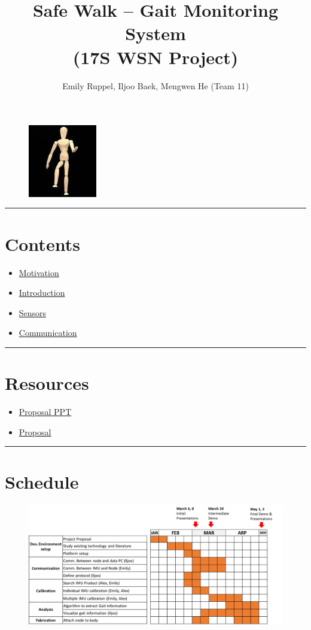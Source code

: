 \documentclass[letterpaper,12pt]{article}
\title{\textbf{Safe Walk -- Gait Monitoring System\\\small (17S WSN Project)}}
\author{Emily Ruppel, Iljoo Baek, Mengwen He (Team 11)}
\newcommand{\panhline}{\begin{center}\rule{\textwidth}{1pt}\end{center}}
\begin{document}
\maketitle

\begin{figure}[!h]
	\centering
	\includegraphics[width=3cm]{./imgs/marven.jpg}
\end{figure}

\panhline
\section{Contents}
\begin{itemize}
	\item \href{./Motivation/document.html}{Motivation}
	\item \href{./Introduction/document.html}{Introduction}
	\item \href{./Sensors/document.html}{Sensors}
	\item \href{./Communication/document.html}{Communication}
\end{itemize}

\panhline
\section{Resources}
\begin{itemize}
	\item \href{./PDFs/GaitMonitoring_Feb-24-17_v0.1.pdf}{Proposal PPT}
	\item \href{./PDFs/proposal_grp11.pdf}{Proposal}
\end{itemize}

\panhline
\section{Schedule}

\begin{figure}[!h]
	\centering
	\includegraphics[width=15cm]{./imgs/schedule.png}
\end{figure}
\end{document}
